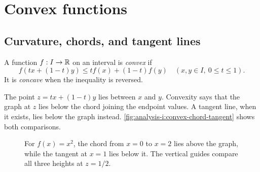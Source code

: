 \section{Convex functions}
\label{sec:analysis-i:convex-functions}

\subsection{Curvature, chords, and tangent lines}
\begin{definition}
  \label{thm:analysis-i:convex-function}
  A function $f:I\to\mathbb{R}$ on an interval is \emph{convex} if
  \[
    f(tx+(1-t)y)\le t f(x)+(1-t)f(y)
    \quad(x,y\in I,\ 0\le t\le1).
  \]
  It is \emph{concave} when the inequality is reversed.
\end{definition}
The point $z=tx+(1-t)y$ lies between $x$ and $y$. Convexity says that
the graph at $z$ lies below the chord joining the endpoint values.
A tangent line, when it exists, lies below the graph instead.
\autoref{fig:analysis-i:convex-chord-tangent} shows both comparisons.

\begin{figure}[htbp]
  \centering
  
  \caption[Chords above and tangents below a convex graph.]{
    For $f(x)=x^2$, the chord from $x=0$ to $x=2$ lies above the graph,
    while the tangent at $x=1$ lies below it. The vertical guides compare
    all three heights at $z=1/2$.}
  \label{fig:analysis-i:convex-chord-tangent}
\end{figure}

